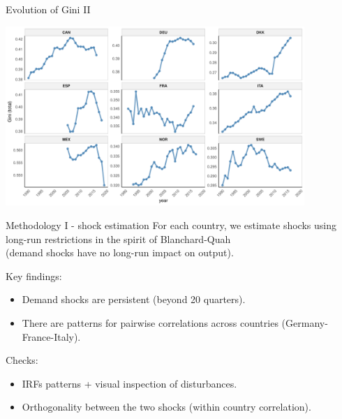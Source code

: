 \documentclass[10pt,leqno,aspectratio=169,presentation]{beamer} %
\begin{document}
\begin{frame}{Evolution of Gini II}
    \begin{center}
    \includegraphics[width=0.85\textwidth]{Slides/Gini_with_MEX_facet.pdf}
    \vspace{0.2cm} %
\end{center}
\end{frame}

\begin{frame}{Methodology I - shock estimation}
\label{vAR}
For each country, we estimate shocks using long-run restrictions in the spirit of Blanchard-Quah \\
            (demand shocks have no long-run impact on output).

Key findings:
        \begin{itemize}
            \item Demand shocks are persistent (beyond 20 quarters).
            \item There are patterns for pairwise correlations across countries (Germany-France-Italy).
        \end{itemize}
Checks:
        \begin{itemize}
            \item IRFs patterns + visual inspection of disturbances.
            \item Orthogonality between the two shocks (within country correlation).
        \end{itemize}
\hyperlink{LRvar}{}
\end{frame}
\end{document}
